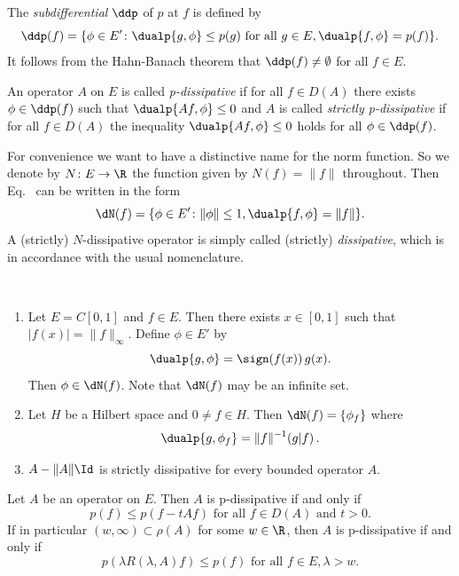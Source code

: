 The \emph{subdifferential} $\ddp$ of\/ $p$ at $f$ is defined by
\begin{equation}\label{eq:a2-2.5}
\ddp(f) = \{\phi \in E' \colon \dualp{g,\phi} \leq p(g) \text{ for all } g \in E, \dualp{f,\phi} = p(f) \}.
\end{equation}
It follows from the Hahn-Banach theorem that $\ddp(f) \neq \emptyset$ for all $f \in E$.
\begin{definition}\label{def:a2-2.1}
An operator $A$ on $E$ is called \emph{p-dissipative} if for all $f \in D(A)$ there exists $\phi \in \ddp(f)$ such that $\dualp{Af,\phi} \leq 0$ 
and $A$ is called \emph{strictly p-dissipative} if for all $f \in D(A)$ the inequality $\dualp{Af,\phi} \leq 0$ holds for all $\phi \in \ddp(f)$.
\end{definition}
For convenience we want to have a distinctive name for the norm function.
So we denote by $N \colon E \to \R$ the function given by $N(f) = \|f\|$ throughout.
Then Eq.~ can be written in the form
\begin{equation}\label{eq:a2-2.6}
\dN(f) = \{\phi \in E' \colon \|\phi\|\leq 1, \dualp{f,\phi} = \|f\|\}.
\end{equation}
A (strictly) $N$-dissipative operator is simply called (strictly) \emph{dissipative}, which is in accordance with the usual nomenclature.
\begin{examples}\label{ex:a2-2.2}  ~ 
\begin{enumerate}[\upshape(i), wide, labelindent=.25em]

\item \label{ex:a2-2.2.1}
Let $E = C[0,1]$ and $f \in E$.
Then there exists $x \in [0,1]$ such that $|f(x)| = \|f\|_{\infty}$.
Define $\phi \in E'$ by 
%
\[
	\dualp{g,\phi} = \sign(f(x))\,g(x) .
\]
%
Then $\phi \in \dN(f)$.
Note that $\dN(f)$ may be an infinite set.
\item \label{ex:a2-2.2.2}
Let $H$ be a Hilbert space and $ 0 \neq f \in H$. %
Then  $\dN(f) = \{\phi_{f}\}$ where 
%
\[
    \dualp{g,\phi_{f}} = \|f\|^{-1}(g \vert f)\,.
\]
%
\item \label{ex:a2-2.2.3}
$A - \|A\|\Id$ is strictly dissipative for every bounded operator $A$.
\end{enumerate}
\end{examples}
\begin{proposition}\label{prop:a2-2.3}
Let $A$ be an operator on $E$.
Then $A$ is p-dissipative if and only if
\begin{equation} \label{eq:a2-2.7}
p(f) \leq p(f - tAf) \text{ for all } f \in D(A) \text{ and } t > 0.
\end{equation}
If in particular $(w,\infty) \subset \rho(A)$ for some $w \in \R$, then $A$ is p-dissipative if and only if
\begin{equation}\label{eq:a2-2.8}
p(\lambda R(\lambda,A)f) \leq p(f) \text{ for all } f \in E, \lambda > w.
\end{equation}
\end{proposition}

